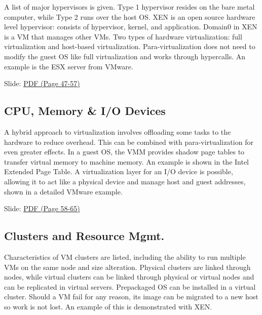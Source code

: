 A list of major hypervisors is given. Type 1 hypervisor resides on the
bare metal computer, while Type 2 runs over the host OS. XEN is an open
source hardware level hypervisor: consists of hypervisor, kernel, and
application. Domain0 in XEN is a VM that manages other VMs. Two types of
hardware virtualization: full virtualization and host-based
virtualization. Para-virtualization does not need to modify the guest OS
like full virtualization and works through hypercalls. An example is the
ESX server from VMware.


  Slide:
  \href{https://drive.google.com/open?id=0B88HKpainTSfQU1uQmxZWHdWQ1k}{PDF
  (Page 47-57)}

\subsection{CPU, Memory \& I/O Devices}

A hybrid approach to virtualization involves offloading some tasks to
the hardware to reduce overhead. This can be combined with
para-virtualization for even greater effects. In a guest OS, the VMM
provides shadow page tables to transfer virtual memory to machine
memory. An example is shown in the Intel Extended Page Table. A
virtualization layer for an I/O device is possible, allowing it to act
like a physical device and manage host and guest addresses, shown in a
detailed VMware example.


  Slide:
  \href{https://drive.google.com/open?id=0B88HKpainTSfQU1uQmxZWHdWQ1k}{PDF
  (Page 58-65)}

\subsection{Clusters and Resource
Mgmt.}

Characteristics of VM clusters are listed, including the ability to run
multiple VMs on the same node and size alteration. Physical clusters are
linked through nodes, while virtual clusters can be linked through
physical or virtual nodes and can be replicated in virtual servers.
Prepackaged OS can be installed in a virtual cluster. Should a VM fail
for any reason, its image can be migrated to a new host so work is not
lost. An example of this is demonstrated with XEN.

